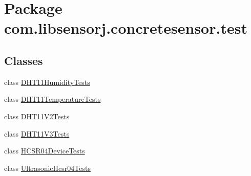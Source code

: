 \hypertarget{namespacecom_1_1libsensorj_1_1concretesensor_1_1test}{}\section{Package com.\+libsensorj.\+concretesensor.\+test}
\label{namespacecom_1_1libsensorj_1_1concretesensor_1_1test}
\subsection*{Classes}
\begin{DoxyCompactItemize}
\item 
class \hyperlink{classcom_1_1libsensorj_1_1concretesensor_1_1test_1_1DHT11HumidityTests}{D\+H\+T11\+Humidity\+Tests}
\item 
class \hyperlink{classcom_1_1libsensorj_1_1concretesensor_1_1test_1_1DHT11TemperatureTests}{D\+H\+T11\+Temperature\+Tests}
\item 
class \hyperlink{classcom_1_1libsensorj_1_1concretesensor_1_1test_1_1DHT11V2Tests}{D\+H\+T11\+V2\+Tests}
\item 
class \hyperlink{classcom_1_1libsensorj_1_1concretesensor_1_1test_1_1DHT11V3Tests}{D\+H\+T11\+V3\+Tests}
\item 
class \hyperlink{classcom_1_1libsensorj_1_1concretesensor_1_1test_1_1HCSR04DeviceTests}{H\+C\+S\+R04\+Device\+Tests}
\item 
class \hyperlink{classcom_1_1libsensorj_1_1concretesensor_1_1test_1_1UltrasonicHcsr04Tests}{Ultrasonic\+Hcsr04\+Tests}
\end{DoxyCompactItemize}
